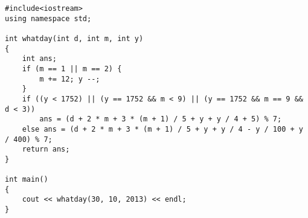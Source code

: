 \begin{lstlisting}
#include<iostream>
using namespace std;

int whatday(int d, int m, int y)
{
	int ans;
	if (m == 1 || m == 2) {
		m += 12; y --;
	}
	if ((y < 1752) || (y == 1752 && m < 9) || (y == 1752 && m == 9 && d < 3))
		ans = (d + 2 * m + 3 * (m + 1) / 5 + y + y / 4 + 5) % 7;
	else ans = (d + 2 * m + 3 * (m + 1) / 5 + y + y / 4 - y / 100 + y / 400) % 7;
	return ans;
}

int main()
{
	cout << whatday(30, 10, 2013) << endl;
}
\end{lstlisting}
